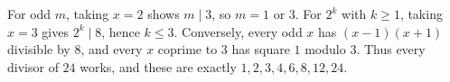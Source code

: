 For odd $m$, taking $x=2$ shows $m\mid3$, so $m=1$ or $3$. For $2^k$ with $k\ge1$, taking $x=3$ gives $2^k\mid8$, hence $k\le3$. Conversely, every odd $x$ has $(x-1)(x+1)$ divisible by $8$, and every $x$ coprime to $3$ has square $1$ modulo $3$. Thus every divisor of $24$ works, and these are exactly $\boxed{1,2,3,4,6,8,12,24}$.
